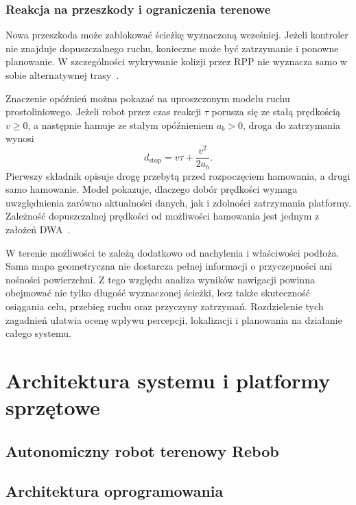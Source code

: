 \documentclass[a4paper,twoside,12pt]{book}
\begin{document}
\subsection{Reakcja na przeszkody i ograniczenia terenowe}

Nowa przeszkoda może zablokować ścieżkę wyznaczoną wcześniej. Jeżeli kontroler nie znajduje dopuszczalnego ruchu, konieczne może być zatrzymanie i ponowne planowanie. W szczególności wykrywanie kolizji przez RPP nie wyznacza samo w sobie alternatywnej trasy~\cite{rb3_macenski2023rpp}.

Znaczenie opóźnień można pokazać na uproszczonym modelu ruchu prostoliniowego. Jeżeli robot przez czas reakcji $\tau$ porusza się ze stałą prędkością $v\geq 0$, a następnie hamuje ze stałym opóźnieniem $a_b>0$, droga do zatrzymania wynosi
\begin{equation}
    d_{\mathrm{stop}} = v\tau + \frac{v^2}{2a_b}.
    \label{eq:planowanie-droga-zatrzymania}
\end{equation}
Pierwszy składnik opisuje drogę przebytą przed rozpoczęciem hamowania, a drugi samo hamowanie. Model pokazuje, dlaczego dobór prędkości wymaga uwzględnienia zarówno aktualności danych, jak i zdolności zatrzymania platformy. Zależność dopuszczalnej prędkości od możliwości hamowania jest jednym z założeń DWA~\cite{rb35_fox1997dwa}.

W terenie możliwości te zależą dodatkowo od nachylenia i właściwości podłoża. Sama mapa geometryczna nie dostarcza pełnej informacji o przyczepności ani nośności powierzchni. Z tego względu analiza wyników nawigacji powinna obejmować nie tylko długość wyznaczonej ścieżki, lecz także skuteczność osiągania celu, przebieg ruchu oraz przyczyny zatrzymań. Rozdzielenie tych zagadnień ułatwia ocenę wpływu percepcji, lokalizacji i planowania na działanie całego systemu.

\chapter{Architektura systemu i platformy sprzętowe}
\section{Autonomiczny robot terenowy Rebob}
\section{Architektura oprogramowania}
\end{document}
